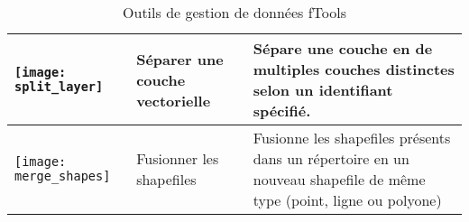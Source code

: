 \begin{table}[ht]
\begin{tabular}{|m{1cm}|m{3cm}|m{9cm}|}
 \hline \texttt{[image: split\_layer]} & Séparer une couche vectorielle & Sépare une couche en de multiples couches distinctes selon un identifiant spécifié. \\
 \hline \texttt{[image: merge\_shapes]} & Fusionner les shapefiles & Fusionne les shapefiles présents dans un répertoire en un nouveau shapefile de même type (point, ligne ou polyone) \\
 \hline
\end{tabular}
\caption{Outils de gestion de données fTools}\label{tab:fTool_data_management}
\end{table}
